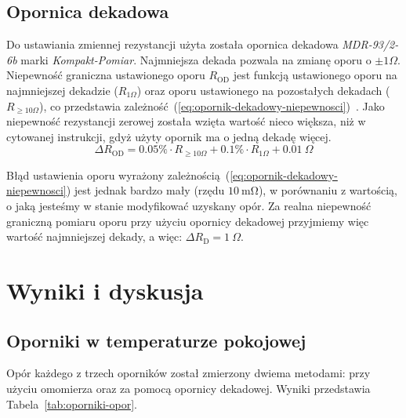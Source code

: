 \documentclass[twocolumn, a4paper, polish, 10pt]{article}
\begin{document}
\subsection{Opornica dekadowa}
Do ustawiania zmiennej rezystancji użyta została opornica dekadowa \textit{MDR-93/2-6b} marki \textit{Kompakt-Pomiar}. Najmniejsza dekada pozwala na zmianę oporu o $\pm 1\Omega$.
Niepewność graniczna ustawionego oporu $R_{\mathrm{OD}}$ jest funkcją ustawionego oporu na najmniejszej dekadzie ($R_{1\Omega}$) oraz oporu ustawionego na pozostałych dekadach ($R_{\ge10\Omega}$), co przedstawia zależność~(\ref{eq:opornik-dekadowy-niepewnosci})~\cite{mdr93-instrukcja}. Jako niepewność rezystancji zerowej została wzięta wartość nieco większa, niż w cytowanej instrukcji, gdyż użyty opornik ma o jedną dekadę więcej.
\begin{equation}
    \Delta R_{\mathrm{OD}} 
        = 0.05\% \cdot R_{\ge10\Omega}
            + 0.1\% \cdot R_{1\Omega}
            + 0.01~\Omega
    \label{eq:opornik-dekadowy-niepewnosci}
\end{equation}

Błąd ustawienia oporu wyrażony zależnością~(\ref{eq:opornik-dekadowy-niepewnosci}) jest jednak bardzo mały (rzędu $10~\mathrm{m\Omega}$), w porównaniu z wartością, o jaką jesteśmy w stanie modyfikować uzyskany opór.
Za realna niepewność graniczną pomiaru oporu przy użyciu opornicy dekadowej przyjmiemy więc wartość najmniejszej dekady, a więc: $\Delta R_{\mathrm{D}} = 1~\Omega$.

\section{Wyniki i dyskusja}
\subsection{Oporniki w temperaturze pokojowej}
Opór każdego z trzech oporników został zmierzony dwiema metodami: przy użyciu omomierza oraz za pomocą opornicy dekadowej. Wyniki przedstawia Tabela~\ref{tab:oporniki-opor}.
\end{document}

